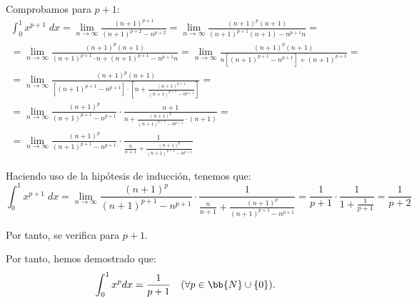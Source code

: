 \begin{ejercicio}
\begin{itemize}
    Comprobamos para $p+1$:
    \begin{multline*}
        \int_0^1 x^{p+1}\;dx
        = \lim_{n\to \infty} \frac{(n+1)^{p+1}}{(n+1)^{p+2} -n^{p+2}}
        = \lim_{n\to \infty} \frac{(n+1)^{p}(n+1)}{(n+1)^{p+1}(n+1) -n^{p+1}n}
        =\\
        = \lim_{n\to \infty} \frac{(n+1)^{p}(n+1)}{(n+1)^{p+1}\cdot n +(n+1)^{p+1} -n^{p+1}n}
        = \lim_{n\to \infty} \frac{(n+1)^{p}(n+1)}{n[(n+1)^{p+1}-n^{p+1}] +(n+1)^{p+1}}
        =\\
        = \lim_{n\to \infty} \frac{(n+1)^{p}(n+1)}{[(n+1)^{p+1}-n^{p+1}]\cdot \left[n+\frac{(n+1)^{p+1}}{(n+1)^{p+1}-n^{p+1}}\right]}
        =\\
        =\lim_{n\to \infty}  \frac{(n+1)^{p}}{(n+1)^{p+1}-n^{p+1}} \cdot \frac{n+1}{n+\frac{(n+1)^{p}}{(n+1)^{p+1}-n^{p+1}}\cdot (n+1)}
        =\\
        =\lim_{n\to \infty}  \frac{(n+1)^{p}}{(n+1)^{p+1}-n^{p+1}} \cdot \frac{1}{\frac{n}{n+1}+\frac{(n+1)^{p}}{(n+1)^{p+1}-n^{p+1}}}
    \end{multline*}

    Haciendo uso de la hipótesis de inducción, tenemos que:
    \begin{equation*}
        \int_0^1 x^{p+1}\;dx
        = \lim_{n\to \infty}  \frac{(n+1)^{p}}{(n+1)^{p+1}-n^{p+1}} \cdot \frac{1}{\frac{n}{n+1}+\frac{(n+1)^{p}}{(n+1)^{p+1}-n^{p+1}}} = \frac{1}{p+1}\cdot \frac{1}{1+\frac{1}{p+1}} = \frac{1}{p+2}
    \end{equation*}

    Por tanto, se verifica para $p+1$.
\end{itemize}

Por tanto, hemos demostrado que:
\begin{equation*}
    \int_0^1 x^pdx = \frac{1}{p+1} \quad (\forall p\in \bb{N}\cup\{0\}).
\end{equation*}
\end{ejercicio}

